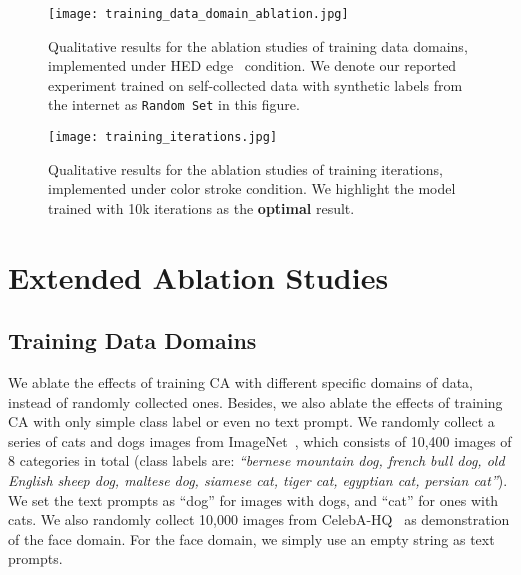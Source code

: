 \documentclass{article}
\begin{document}
\begin{figure*}[t!]
  \centering
  \texttt{[image: training\_data\_domain\_ablation.jpg]} \caption{Qualitative results for the ablation studies of training data domains, implemented under HED edge~\cite{xie2015holistically} condition. We denote our reported experiment trained on self-collected data with synthetic labels from the internet as \texttt{Random Set} in this figure.}
  \label{figure:training data domains}
  \end{figure*}

\begin{figure*}[t!]
    \centering
    \texttt{[image: training\_iterations.jpg]} \caption{Qualitative results for the ablation studies of training iterations, implemented under color stroke condition. We highlight the model trained with 10k iterations as the \textbf{optimal} result.}
    \label{figure:training iterations}
\end{figure*}

\section{Extended Ablation Studies}
\label{section:extended ablation studies}

\subsection{Training Data Domains}
We ablate the effects of training CA with different specific domains of data, instead of randomly collected ones. Besides, we also ablate the effects of training CA with only simple class label or even no text prompt. We randomly collect a series of cats and dogs images from ImageNet~\cite{deng2009imagenet}, which consists of 10,400 images of 8 categories in total (class labels are: \textit{``bernese mountain dog, french bull dog, old English sheep dog, maltese dog, siamese cat, tiger cat, egyptian cat, persian cat''}). We set the text prompts as ``dog'' for images with dogs, and ``cat'' for ones with cats. We also randomly collect 10,000 images from CelebA-HQ~\cite{karras2017progressive} as demonstration of the face domain. For the face domain, we simply use an empty string as text prompts.
\end{document}
